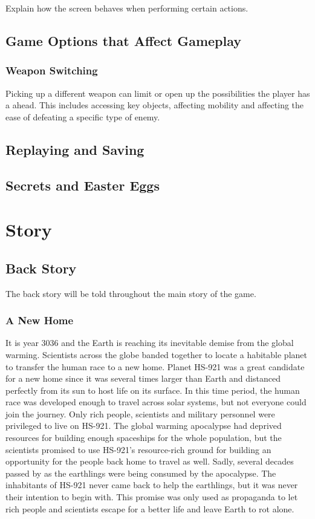 \documentclass[12pt]{article}
\begin{document}
Explain how the screen behaves when performing certain actions.

\subsection{Game Options that Affect Gameplay}

\subsubsection{Weapon Switching}

Picking up a different weapon can limit or open up the possibilities the player has a ahead. This includes accessing key objects, affecting mobility and affecting the ease of defeating a specific type of enemy. 

\subsection{Replaying and Saving}

\subsection{Secrets and Easter Eggs}

\section{Story}

\subsection{Back Story}

The back story will be told throughout the main story of the game. 

\subsubsection{A New Home}

It is year 3036 and the Earth is reaching its inevitable demise from the global warming. Scientists across the globe banded together to locate a habitable planet to transfer the human race to a new home. Planet HS-921 was a great candidate for a new home since it was several times larger than Earth and distanced perfectly from its sun to host life on its surface. In this time period, the human race was  developed enough to travel across solar systems, but not everyone could join the journey. Only rich people, scientists and military personnel were privileged to live on HS-921. The global warming apocalypse had deprived resources for building enough spaceships for the whole population, but the scientists promised to use HS-921's resource-rich ground for building an opportunity for the people back home to travel as well. Sadly, several decades passed by as the earthlings were being consumed by the apocalypse. The inhabitants of HS-921 never came back to help the earthlings, but it was never their intention to begin with. This promise was only used as propaganda to let rich people and scientists escape for a better life and leave Earth to rot alone. 
\end{document}
